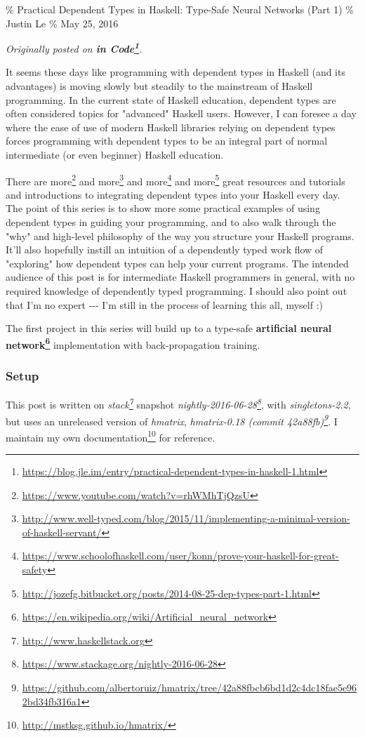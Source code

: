 \documentclass[]{article}
\renewcommand{\href}[2]{#2\footnote{\url{#1}}}
\begin{document}
\% Practical Dependent Types in Haskell: Type-Safe Neural Networks (Part 1) \%
Justin Le \% May 25, 2016

\emph{Originally posted on
\textbf{\href{https://blog.jle.im/entry/practical-dependent-types-in-haskell-1.html}{in
Code}}.}

It seems these days like programming with dependent types in Haskell (and its
advantages) is moving slowly but steadily to the mainstream of Haskell
programming. In the current state of Haskell education, dependent types are
often considered topics for "advanced" Haskell users. However, I can foresee a
day where the ease of use of modern Haskell libraries relying on dependent types
forces programming with dependent types to be an integral part of normal
intermediate (or even beginner) Haskell education.

There are \href{https://www.youtube.com/watch?v=rhWMhTjQzsU}{more} and
\href{http://www.well-typed.com/blog/2015/11/implementing-a-minimal-version-of-haskell-servant/}{more}
and
\href{https://www.schoolofhaskell.com/user/konn/prove-your-haskell-for-great-safety}{more}
and
\href{http://jozefg.bitbucket.org/posts/2014-08-25-dep-types-part-1.html}{more}
great resources and tutorials and introductions to integrating dependent types
into your Haskell every day. The point of this series is to show more some
practical examples of using dependent types in guiding your programming, and to
also walk through the "why" and high-level philosophy of the way you structure
your Haskell programs. It'll also hopefully instill an intuition of a
dependently typed work flow of "exploring" how dependent types can help your
current programs. The intended audience of this post is for intermediate Haskell
programmers in general, with no required knowledge of dependently typed
programming. I should also point out that I'm no expert -\/-\/- I'm still in the
process of learning this all, myself :)

The first project in this series will build up to a type-safe
\textbf{\href{https://en.wikipedia.org/wiki/Artificial_neural_network}{artificial
neural network}} implementation with back-propagation training.

\subsubsection{Setup}

This post is written on \emph{\href{http://www.haskellstack.org}{stack}}
snapshot
\emph{\href{https://www.stackage.org/nightly-2016-06-28}{nightly-2016-06-28}},
with \emph{singletons-2.2}, but uses an unreleased version of \emph{hmatrix},
\emph{\href{https://github.com/albertoruiz/hmatrix/tree/42a88fbcb6bd1d2c4dc18fae5e962bd34fb316a1}{hmatrix-0.18
(commit 42a88fb)}}. I \href{http://mstksg.github.io/hmatrix/}{maintain my own
documentation} for reference.
\end{document}
